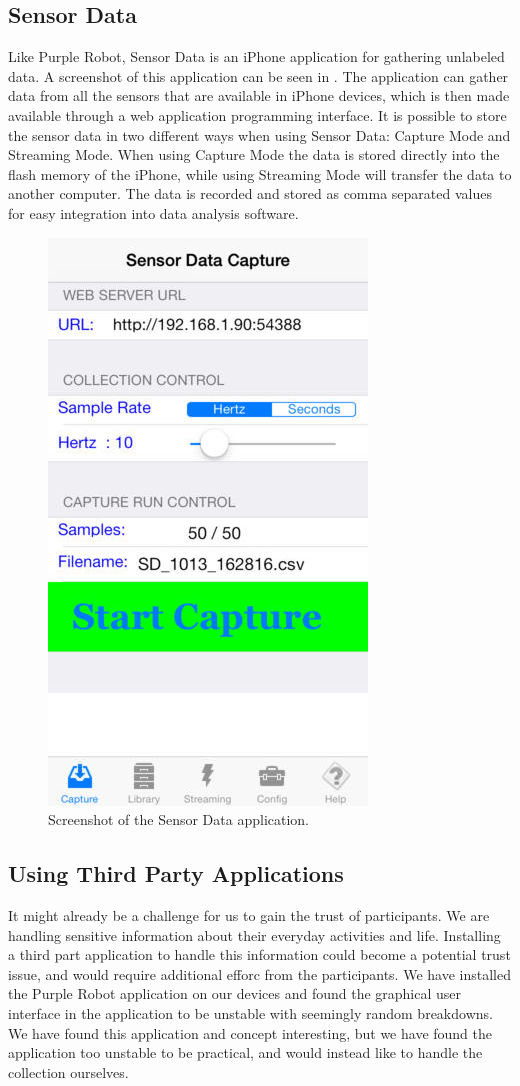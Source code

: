 \subsection{Sensor Data}
\label{sub:sensor_data}
Like Purple Robot, Sensor Data is an iPhone application for gathering unlabeled data. A screenshot of this application can be seen in . The application can gather data from all the sensors that are available in iPhone devices, which is then made available through a web application programming interface. It is possible to store the sensor data in two different ways when using Sensor Data: Capture Mode and Streaming Mode. When using Capture Mode the data is stored directly into the flash memory of the iPhone, while using Streaming Mode will transfer the data to another computer. The data is recorded and stored as comma separated values for easy integration into data analysis software.

\begin{figure}[!htbp]
	\centering
	\includegraphics[height=0.5\textwidth]{graphic/existing_solutions/sensor_data}
	\caption[]{Screenshot of the Sensor Data application\parencite{sensor_data_app_itunes}.}
	\label{fig:sensor_data_screenshot}
\end{figure}
\FloatBarrier

\subsection{Using Third Party Applications}
It might already be a challenge for us to gain the trust of participants. We are handling sensitive information about their everyday activities and life. Installing a third part application to handle this information could become a potential trust issue, and would require additional efforc from the participants. We have installed the Purple Robot application on our devices and found the graphical user interface in the application to be unstable with seemingly random breakdowns. We have found this application and concept interesting, but we have found the application too unstable to be practical, and would instead like to handle the collection ourselves. 